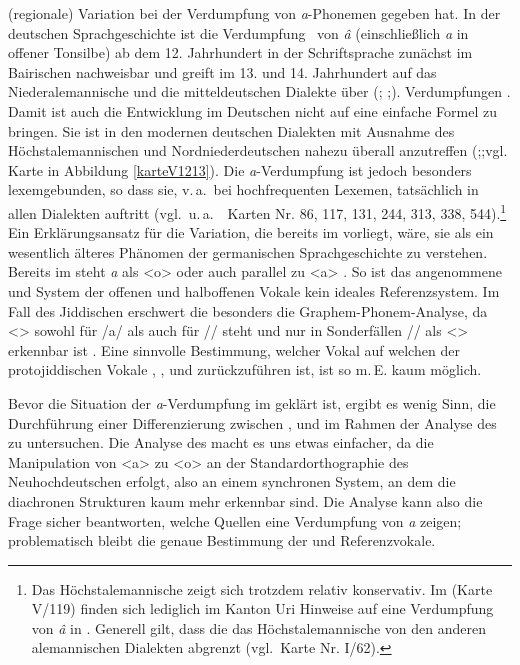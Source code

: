 (regionale) Variation bei der Verdumpfung von \textit{a}-Phonemen gegeben hat. In der deutschen Sprachgeschichte ist die Verdumpfung \,%
von {\mhd} \textit{â} (einschließlich \textit{a} in offener Tonsilbe) ab dem 12. Jahrhundert in der Schriftsprache zunächst im Bairischen nachweisbar und greift im 13. und 14. Jahrhundert auf das Niederalemannische und die mitteldeutschen Dialekte  über (\citealt[212]{Schirmunski1962}; \citealt[§48]{Paul2007};\citealt[§L14]{Ebert1993}).
\largerpage[-1]
Verdumpfungen  \parencite[§48]{Paul2007}. Damit ist  auch die Entwicklung im Deutschen nicht auf eine einfache Formel zu bringen. Sie ist in den modernen deutschen Dialekten mit Ausnahme des Höchstalemannischen und Nordniederdeutschen nahezu überall anzutreffen (\citealt[212]{Schirmunski1962};\citealt[§L14]{Ebert1993};vgl.\, Karte in Abbildung \ref{karteV1213}). Die \textit{a}-Verdumpfung ist jedoch besonders lexemgebunden, so dass sie, v.\,a.\, bei hochfrequenten Lexemen, tatsächlich in allen Dialekten auftritt (vgl.\, u.\,a.\,   \,%
Karten Nr. 86, 117, 131, 244, 313, 338, 544).\footnote{Das Höchstalemannische zeigt sich trotzdem relativ konservativ. Im  (Karte V/119) finden sich lediglich im Kanton Uri Hinweise auf eine Verdumpfung von \textit{â} in . Generell gilt, dass die  das Höchstalemannische von den anderen alemannischen Dialekten abgrenzt (vgl.\,  Karte Nr. I/62).} Ein Erklärungsansatz für die Variation, die bereits im {\MHD} vorliegt, wäre, sie als ein wesentlich älteres Phänomen der germanischen Sprachgeschichte zu verstehen. Bereits im {\AHD} steht {\germ} \textit{a} als <o> oder auch parallel zu <a> \parencite[§ 25]{BrauneReiffenstein2004}. So ist das angenommene {\mhd} und {\urj} System der offenen und halboffenen Vokale kein ideales Referenzsystem. Im Fall des Jiddischen erschwert die  besonders die Graphem-Phonem-Analyse, da <> sowohl für /a/ als auch für /\textopeno/ steht und nur in Sonderfällen /\textopeno/ als <> 
erkennbar ist \parencite[93–121]{Timm1987}. Eine sinnvolle Bestimmung, welcher Vokal auf welchen der protojiddischen Vokale , ,  und  zurückzuführen ist, ist so m.\,E. kaum möglich. 


Bevor die Situation der \textit{a}-Verdumpfung im \hai{{\WJ}} geklärt ist, ergibt es wenig Sinn, die Durchführung einer Differenzierung zwischen ,  und  im Rahmen der Analyse des \hai{{\LiJi}} zu untersuchen. Die Analyse des \hai{{\LiJi}} macht es uns etwas einfacher, da die Manipulation von <a> zu <o> an der Standardorthographie des Neuhochdeutschen erfolgt, also an einem synchronen System, an dem die diachronen Strukturen kaum mehr erkennbar sind. Die Analyse kann also die Frage sicher beantworten, welche Quellen eine Verdumpfung von {\germ} \textit{a} zeigen;\, problematisch bleibt die genaue Bestimmung der {\mhd} und {\urj} Referenzvokale. 

